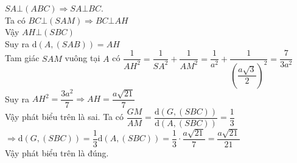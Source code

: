 \begin{ex}
{\begin{itemchoice}
			$SA\bot \left(ABC\right)\Rightarrow SA\bot BC$.\\
			Ta có $BC\bot \left(SAM\right)\Rightarrow BC\bot AH$\\
			Vậy $AH\bot \left(SBC\right)$\\
			Suy ra $\mathrm{d}\left(A,\left(SAB\right) \right)=AH$\\
			Tam giác $SAM$ vuông tại $A$ có $\dfrac{1}{AH^2}=\dfrac{1}{SA^2}+\dfrac{1}{AM^2}=\dfrac{1}{a^2}+\dfrac{1}{{{\left(\dfrac{a\sqrt{3}}{2} \right)}^2}}=\dfrac{7}{3a^2}$\\
			Suy ra $AH^2=\dfrac{3a^2}{7}\Rightarrow AH=\dfrac{a\sqrt{21}}{7}$\\
			Vậy phát biểu trên là sai.
			\itemch Ta có $\dfrac{GM}{AM}=\dfrac{\mathrm{d}\left(G,\left(SBC\right) \right)}{\mathrm{d}\left(A,\left(SBC\right) \right)}=\dfrac{1}{3}$\\
			$\Rightarrow \mathrm{d}\left(G,\left(SBC\right) \right)=\dfrac{1}{3} \mathrm{d}\left(A,\left(SBC\right) \right)=\dfrac{1}{3}\cdot\dfrac{a\sqrt{21}}{7}=\dfrac{a\sqrt{21}}{21}$\\
			Vậy phát biểu trên là đúng.
	\end{itemchoice}}
\end{ex}
